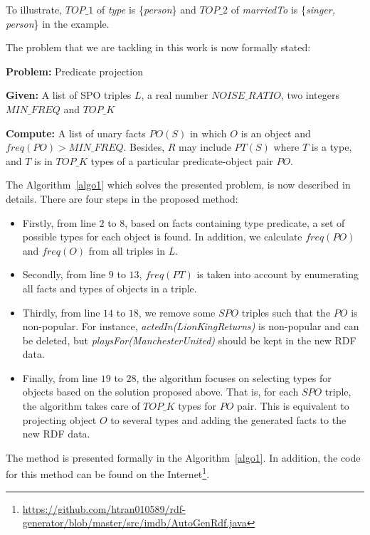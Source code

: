 \documentclass{acm_proc_article-sp}
\begin{document}
To illustrate, $TOP\_1$ of \textit{type} is \{\textit{person}\} and $TOP\_2$ of \textit{marriedTo} is \{\textit{singer, person}\} in the example.

The problem that we are tackling in this work is now formally stated:

\begin{framed}
\textbf{Problem:} Predicate projection

\textbf{Given:} A list of SPO triples $L$, a real number $NOISE\_RATIO$, two integers $MIN\_FREQ$ and $TOP\_K$

\textbf{Compute:} A list of unary facts $PO(S)$ in which $O$ is an object and $freq(PO) > MIN\_FREQ$. Besides, $R$ may include $PT(S)$ where $T$ is a type, and $T$ is in $TOP\_K$ types of a particular predicate-object pair $PO$.
\end{framed}

The Algorithm~\ref{algo1} which solves the presented problem, is now described in details. There are four steps in the proposed method:
\begin{itemize}
\item Firstly, from line $2$ to $8$, based on facts containing type predicate, a set of possible types for each object is found. In addition, we calculate $freq(PO)$ and $freq(O)$ from all triples in $L$.
\item Secondly, from line $9$ to $13$, $freq(PT)$ is taken into account by enumerating all facts and types of objects in a triple.
\item Thirdly, from line $14$ to $18$, we remove some $SPO$ triples such that the $PO$ is non-popular. For instance, \textit{actedIn(LionKingReturns)} is non-popular and can be deleted, but \textit{playsFor(ManchesterUnited)} should be kept in the new RDF data.
\item Finally, from line $19$ to $28$, the algorithm focuses on selecting types for objects based on the solution proposed above. That is, for each $SPO$ triple, the algorithm takes care of $TOP\_K$ types for $PO$ pair. This is equivalent to projecting object $O$ to several types and adding the generated facts to the new RDF data.
\end{itemize}

The method is presented formally in the Algorithm~\ref{algo1}. In addition, the code for this method can be found on the Internet\footnote{\url{https://github.com/htran010589/rdf-generator/blob/master/src/imdb/AutoGenRdf.java}}.
\end{document}
